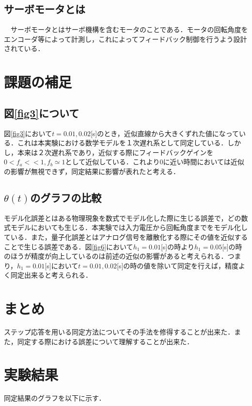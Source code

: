 \documentclass[11pt,a4paper]{jsarticle}
\begin{document}
  \subsection{サーボモータとは}
  　サーボモータとはサーボ機構を含むモータのことである．モータの回転角度をエンコーダ等によって計測し，これによってフィードバック制御を行うよう設計されている．

\newpage

\thispagestyle{fancy}
\cfoot{}

\section{課題の補足}
\subsection{図\ref{fig3}について}
図\ref{fig3}において$t = 0.01,0.02$[s]のとき，近似直線から大きくずれた値になっている．これは本実験における数学モデルを１次遅れ系として同定している．しかし，本来は２次遅れ系であり，近似する際にフィードバックゲインを$0 < f_a << 1, f_b \simeq 1$として近似している．これより0に近い時間においては近似の影響が無視できず，同定結果に影響が表れたと考える．

\subsection{$\theta(t)$のグラフの比較}
モデル化誤差とはある物理現象を数式でモデル化した際に生じる誤差で，どの数式モデルにおいても生じる．本実験では入力電圧から回転角度までをモデル化している．また，量子化誤差とはアナログ信号を離散化する際にその値を近似することで生じる誤差である．図\ref{fig6}において$h_1 = 0.01$[s]の時より$h_1 = 0.05$[s]の時のほうが精度が向上しているのは前述の近似の影響があると考えられる．つまり，$h_1 = 0.01$[s]において$t = 0.01,0.02$[s]の時の値を除いて同定を行えば，精度よく同定出来ると考えられる．

\section{まとめ}
ステップ応答を用いる同定方法についてその手法を修得することが出来た．また，同定する際における誤差について理解することが出来た．

\newpage
\thispagestyle{fancy}
\cfoot{}

\setcounter{section}{3}
\section{実験結果}
同定結果のグラフを以下に示す．
\end{document}
